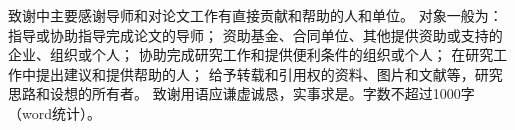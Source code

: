 
\begin{acknowledgements}
  致谢中主要感谢导师和对论文工作有直接贡献和帮助的人和单位。
  对象一般为：指导或协助指导完成论文的导师；
  资助基金、合同单位、其他提供资助或支持的企业、组织或个人；
  协助完成研究工作和提供便利条件的组织或个人；
  在研究工作中提出建议和提供帮助的人；
  给予转载和引用权的资料、图片和文献等，研究思路和设想的所有者。
致谢用语应谦虚诚恳，实事求是。字数不超过1000字（word统计）。

\end{acknowledgements}
